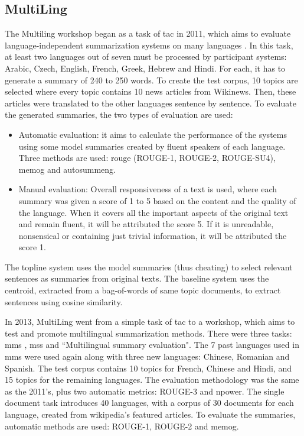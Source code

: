 \subsection{MultiLing}

The Multiling workshop began as a task of \ac{tac} in 2011, which aims to evaluate language-independent summarization systems on many languages \citep{11-giannakopoulos-al}.
In this task, at least two languages out of seven must be processed by participant systems: Arabic, Czech, English, French, Greek, Hebrew and Hindi.
For each, it has to generate a summary of 240 to 250 words.
To create the test corpus, 10 topics are selected where every topic contains 10 news articles from Wikinews.
Then, these articles were translated to the other languages sentence by sentence.
To evaluate the generated summaries, the two types of evaluation are used:
\begin{itemize}
	\item Automatic evaluation: it aims to calculate the performance of the systems using some model summaries created by fluent speakers of each language.
	Three methods are used: \ac{rouge} (ROUGE-1, ROUGE-2, ROUGE-SU4), \ac{memog} and \ac{autosummeng}.
	
	\item Manual evaluation: 
	Overall responsiveness of a text is used, where each summary was given a score of 1 to 5 based on the content and the quality of the language.
	When it covers all the important aspects of the original text and remain fluent, it will be attributed the score 5.
	If it is unreadable, nonsensical or containing just trivial information, it will be attributed the score 1.
\end{itemize}
The topline system uses the model summaries (thus cheating) to select relevant sentences as summaries from original texts. 
The baseline system uses the centroid, extracted from a bag-of-words of same topic documents, to extract sentences using cosine similarity. 

In 2013, MultiLing went from a simple task of \ac{tac} to a workshop, which aims to test and promote multilingual summarization methods.
There were three tasks: \ac{mms} \citep{13-giannakopoulos},  \ac{mss} \citep{13-kubina-all} and ``Multilingual summary evaluation".
The 7 past languages used in \ac{mms} were used again along with three new languages: Chinese,  Romanian and Spanish.
The test corpus contains 10 topics for French, Chinese and Hindi, and 15 topics for the remaining languages. 
The evaluation methodology was the same as the 2011's, plus two automatic metrics: ROUGE-3 and \ac{npower}.
%
The single document task introduces 40 languages, with a corpus of 30 documents for each language, created from wikipedia's featured articles.
To evaluate the summaries, automatic methods are used: ROUGE-1, ROUGE-2 and \ac{memog}.



